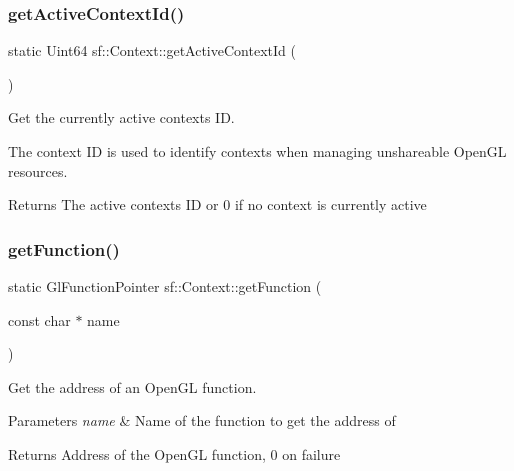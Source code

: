 \subsubsection{\texorpdfstring{getActiveContextId()}{getActiveContextId()}}
{\footnotesize\ttfamily static Uint64 sf\+::\+Context\+::get\+Active\+Context\+Id (\begin{DoxyParamCaption}{ }\end{DoxyParamCaption})\hspace{0.3cm}{\ttfamily [static]}}



Get the currently active context\textquotesingle{}s ID. 

The context ID is used to identify contexts when managing unshareable Open\+GL resources.

\begin{DoxyReturn}{Returns}
The active context\textquotesingle{}s ID or 0 if no context is currently active \begin{DoxyVerb}\end{DoxyVerb}
 
\end{DoxyReturn}
\mbox{\label{classsf_1_1_context_a998980d311effdf6223ce40d934c23c3}} 
\subsubsection{\texorpdfstring{getFunction()}{getFunction()}}
{\footnotesize\ttfamily static Gl\+Function\+Pointer sf\+::\+Context\+::get\+Function (\begin{DoxyParamCaption}\item[{const char $\ast$}]{name }\end{DoxyParamCaption})\hspace{0.3cm}{\ttfamily [static]}}



Get the address of an Open\+GL function. 


\begin{DoxyParams}{Parameters}
{\em name} & Name of the function to get the address of\\
\hline
\end{DoxyParams}
\begin{DoxyReturn}{Returns}
Address of the Open\+GL function, 0 on failure \begin{DoxyVerb}\end{DoxyVerb}
 
\end{DoxyReturn}
\mbox{\label{classsf_1_1_context_a2cc81c5466553d1901f660d866b4b48b}} 
